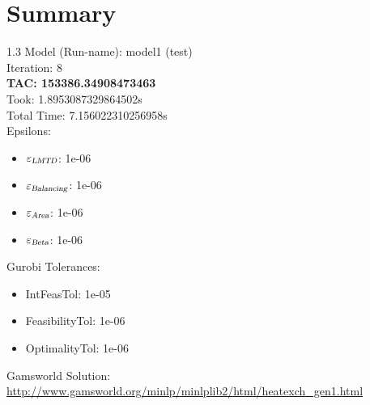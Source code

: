 \documentclass{article}%
\begin{document}
%
\normalsize%
\section{Summary}%
\thispagestyle{plain}%
\begin{spacing}{1.3}%
\Large%
Model (Run-name): model1 (test)\\%
Iteration: 8\\%
\textbf{TAC: 153386.34908473463}\\%
Took: 1.8953087329864502s\\%
Total Time: 7.156022310256958s\\%
Epsilons:%
\begin{itemize}%
	\item $\varepsilon_{\textsl{LMTD}}$: 1e-06%
	\item $\varepsilon_{\textsl{Balancing}}$: 1e-06%
	\item $\varepsilon_{\textsl{Area}}$: 1e-06%
	\item $\varepsilon_{\textsl{Beta}}$: 1e-06%
\end{itemize}%
Gurobi Tolerances:%
\begin{itemize}%
	\item IntFeasTol: 1e-05%
	\item FeasibilityTol: 1e-06%
	\item OptimalityTol: 1e-06%
\end{itemize}%
\end{spacing}%
\normalsize%
Gamsworld Solution: \url{http://www.gamsworld.org/minlp/minlplib2/html/heatexch_gen1.html}%
%
\clearpage%
\end{document}
